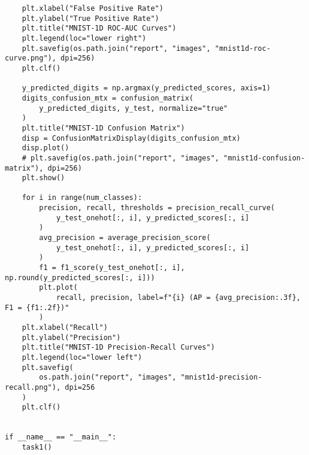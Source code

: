 \documentclass{article}
\begin{document}
\begin{lstlisting}
    plt.xlabel("False Positive Rate")
    plt.ylabel("True Positive Rate")
    plt.title("MNIST-1D ROC-AUC Curves")
    plt.legend(loc="lower right")
    plt.savefig(os.path.join("report", "images", "mnist1d-roc-curve.png"), dpi=256)
    plt.clf()

    y_predicted_digits = np.argmax(y_predicted_scores, axis=1)
    digits_confusion_mtx = confusion_matrix(
        y_predicted_digits, y_test, normalize="true"
    )
    plt.title("MNIST-1D Confusion Matrix")
    disp = ConfusionMatrixDisplay(digits_confusion_mtx)
    disp.plot()
    # plt.savefig(os.path.join("report", "images", "mnist1d-confusion-matrix"), dpi=256)
    plt.show()

    for i in range(num_classes):
        precision, recall, thresholds = precision_recall_curve(
            y_test_onehot[:, i], y_predicted_scores[:, i]
        )
        avg_precision = average_precision_score(
            y_test_onehot[:, i], y_predicted_scores[:, i]
        )
        f1 = f1_score(y_test_onehot[:, i], np.round(y_predicted_scores[:, i]))
        plt.plot(
            recall, precision, label=f"{i} (AP = {avg_precision:.3f}, F1 = {f1:.2f})"
        )
    plt.xlabel("Recall")
    plt.ylabel("Precision")
    plt.title("MNIST-1D Precision-Recall Curves")
    plt.legend(loc="lower left")
    plt.savefig(
        os.path.join("report", "images", "mnist1d-precision-recall.png"), dpi=256
    )
    plt.clf()


if __name__ == "__main__":
    task1()
\end{lstlisting}

\small


\end{document}
